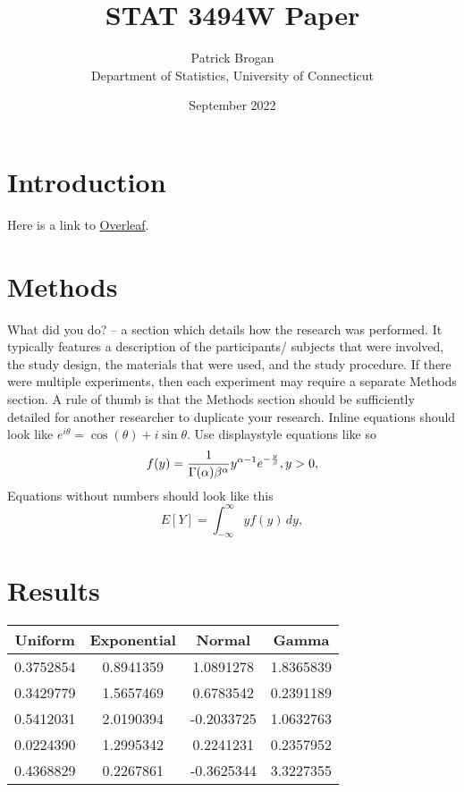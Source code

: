 \documentclass[12pt, letterpaper, twoside]{article}\usepackage[]{graphicx}\usepackage[]{xcolor}
\title{STAT 3494W Paper}
\author{Patrick Brogan\\[1ex]
  Department of Statistics, University of Connecticut\\}
\date{September 2022}
\begin{document}
\maketitle

\begin{abstract}
\lipsum[3]
\end{abstract}

\section*{Introduction}
Here is a link to \href{http://www.overleaf.com}{Overleaf}. \lipsum[5]
\section*{Methods}
What did you do? – a section which details how the research was
performed.  It typically features a description of the participants/
subjects that were involved, the study design, the materials that were
used, and the study procedure.  If there were multiple experiments,
then each experiment may require a separate Methods section.  A rule
of thumb is that the Methods section should be sufficiently detailed
for another researcher to duplicate your research. Inline equations should look like \(e^{i\theta} = \cos(\theta) + i\sin\theta\). Use displaystyle equations like so \begin{equation}
  f(y) = \frac{1}{\Gamma(\alpha)\beta^\alpha}\*y^{\alpha-1}e^{-\frac{y}{\beta}}, y > 0,
\end{equation}
Equations without numbers should look like this
\[
  E[Y] = \int_{-\infty}^{\infty} yf(y) \,dy,
\]


\section*{Results}
\lipsum[6]

\begin{center}
\begin{tabular}{||c c c c||}
 \hline
 Uniform & Exponential & Normal & Gamma \\ [0.5ex]
 \hline\hline
 0.3752854 & 0.8941359 & 1.0891278 & 1.8365839 \\
 \hline
 0.3429779 & 1.5657469 & 0.6783542 & 0.2391189 \\
 \hline
 0.5412031 & 2.0190394 & -0.2033725 & 1.0632763 \\
 \hline
 0.0224390 & 1.2995342 & 0.2241231 & 0.2357952 \\
 \hline
 0.4368829 & 0.2267861 & -0.3625344 & 3.3227355 \\ [1ex]
 \hline
\end{tabular}
\end{center}
\end{document}
